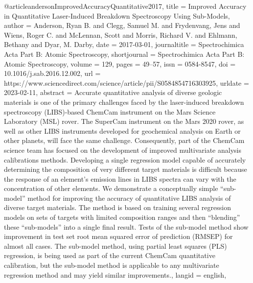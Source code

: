 @article{andersonImprovedAccuracyQuantitative2017,
  title = {Improved Accuracy in Quantitative Laser-Induced Breakdown Spectroscopy Using Sub-Models},
  author = {Anderson, Ryan B. and Clegg, Samuel M. and Frydenvang, Jens and Wiens, Roger C. and McLennan, Scott and Morris, Richard V. and Ehlmann, Bethany and Dyar, M. Darby},
  date = {2017-03-01},
  journaltitle = {Spectrochimica Acta Part B: Atomic Spectroscopy},
  shortjournal = {Spectrochimica Acta Part B: Atomic Spectroscopy},
  volume = {129},
  pages = {49--57},
  issn = {0584-8547},
  doi = {10.1016/j.sab.2016.12.002},
  url = {https://www.sciencedirect.com/science/article/pii/S0584854716303925},
  urldate = {2023-02-11},
  abstract = {Accurate quantitative analysis of diverse geologic materials is one of the primary challenges faced by the laser-induced breakdown spectroscopy (LIBS)-based ChemCam instrument on the Mars Science Laboratory (MSL) rover. The SuperCam instrument on the Mars 2020 rover, as well as other LIBS instruments developed for geochemical analysis on Earth or other planets, will face the same challenge. Consequently, part of the ChemCam science team has focused on the development of improved multivariate analysis calibrations methods. Developing a single regression model capable of accurately determining the composition of very different target materials is difficult because the response of an element's emission lines in LIBS spectra can vary with the concentration of other elements. We demonstrate a conceptually simple “sub-model” method for improving the accuracy of quantitative LIBS analysis of diverse target materials. The method is based on training several regression models on sets of targets with limited composition ranges and then “blending” these “sub-models” into a single final result. Tests of the sub-model method show improvement in test set root mean squared error of prediction (RMSEP) for almost all cases. The sub-model method, using partial least squares (PLS) regression, is being used as part of the current ChemCam quantitative calibration, but the sub-model method is applicable to any multivariate regression method and may yield similar improvements.},
  langid = {english},
}


